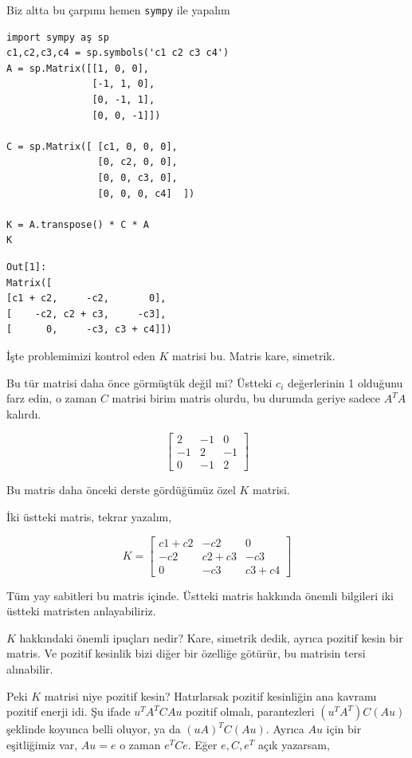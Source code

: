\documentclass[12pt,fleqn]{article}\usepackage{../../common}
\begin{document}
Biz altta bu çarpımı hemen \verb!sympy! ile yapalım
  
\begin{verbatim}
import sympy aş sp
c1,c2,c3,c4 = sp.symbols('c1 c2 c3 c4')
A = sp.Matrix([[1, 0, 0],
               [-1, 1, 0],
               [0, -1, 1],
               [0, 0, -1]])

C = sp.Matrix([ [c1, 0, 0, 0],
                [0, c2, 0, 0],
                [0, 0, c3, 0],
                [0, 0, 0, c4]  ])

K = A.transpose() * C * A
K
\end{verbatim}

\begin{verbatim}
Out[1]: 
Matrix([
[c1 + c2,     -c2,       0],
[    -c2, c2 + c3,     -c3],
[      0,     -c3, c3 + c4]])
\end{verbatim}

İşte problemimizi kontrol eden $K$ matrisi bu. Matris kare, simetrik.

Bu tür matrisi daha önce görmüştük değil mi? Üstteki $c_i$ değerlerinin 1
olduğunu farz edin, o zaman $C$ matrisi birim matris olurdu, bu durumda
geriye sadece $A^T A$ kalırdı.

$$
\left[\begin{array}{rrr}
2 & -1 & 0 \\ -1 & 2 & -1 \\ 0 & -1 & 2
\end{array}\right]
$$

Bu matris daha önceki derste gördüğümüz özel $K$ matrisi. 

İki üstteki matris, tekrar yazalım,

$$ K = 
\left[\begin{array}{rrr}
c1 + c2   &     -c2 &       0 \\
-c2       & c2 + c3 &     -c3 \\
0         & -c3     &      c3 + c4
\end{array}\right]
$$

Tüm yay sabitleri bu matris içinde. Üstteki matris hakkında önemli bilgileri
iki üstteki matristen anlayabiliriz. 

$K$ hakkındaki önemli ipuçları nedir? Kare, simetrik dedik, ayrıca pozitif kesin
bir matris. Ve pozitif kesinlik bizi diğer bir özelliğe götürür, bu matrisin
tersi alınabilir.

Peki $K$ matrisi niye pozitif kesin? Hatırlarsak pozitif kesinliğin ana kavramı
pozitif enerji idi. Şu ifade $u^T A^T C A u$ pozitif olmalı, parantezleri 
$(u^T A^T) C (A u)$ şeklinde koyunca belli oluyor, ya da $(u A)^T C (A u)$. 
Ayrıca $Au$ için bir eşitliğimiz var, $Au = e$ o zaman $e^T C e$. Eğer $e,C,e^T$
açık yazarsam,
\end{document}
